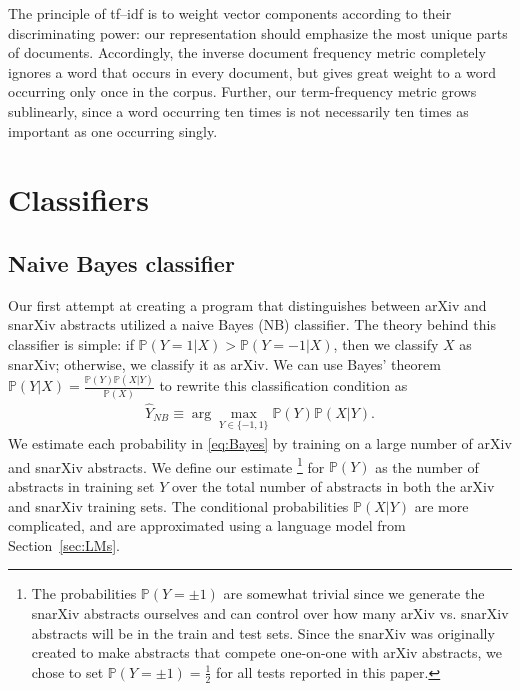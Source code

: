 \documentclass{article}
\renewcommand{\P}{\mathbb{P}}
\begin{document}
The principle of tf--idf is to weight vector components according to their discriminating power: our representation should emphasize the most unique parts of documents.
Accordingly, the inverse document frequency metric completely ignores a word that occurs in every document, but gives great weight to a word occurring only once in the corpus.
Further, our term-frequency metric grows sublinearly, since a word occurring ten times is not necessarily ten times as important as one occurring singly.











\section{Classifiers} \label{sec:classifiers}
\subsection{Naive Bayes classifier}
Our first attempt at creating a program that distinguishes between arXiv and snarXiv abstracts utilized a naive Bayes (NB) classifier.
The theory behind this classifier is simple: if $\P(Y=1|X) > \P(Y=-1|X)$, then we classify $X$ as snarXiv; otherwise, we classify it as arXiv.
We can use Bayes' theorem $\P(Y|X) = \frac{\P(Y)\P(X|Y)}{\P(X)}$ to rewrite this classification condition as
\begin{align}
  \widehat{Y}_{NB} \equiv \arg\max_{Y\in\{-1,1\}} \P(Y)\P(X|Y). \label{eq:Bayes}
\end{align}
We estimate each probability in \eqref{eq:Bayes} by training on a large number of arXiv and snarXiv abstracts.
We define our estimate%
\footnote{The probabilities $\P(Y=\pm1)$ are somewhat trivial since we generate the snarXiv abstracts ourselves and can control over how many arXiv vs. snarXiv abstracts will be in the train and test sets. Since the snarXiv was originally created to make abstracts that compete one-on-one with arXiv abstracts, we chose to set $\P(Y=\pm1)=\tfrac{1}{2}$ for all tests reported in this paper.}
%
for $\P(Y)$ as the number of abstracts in training set $Y$ over the total number of abstracts in both the arXiv and snarXiv training sets.
The conditional probabilities $\P(X|Y)$ are more complicated, and are approximated using a language model from Section~\ref{sec:LMs}.
\end{document}
